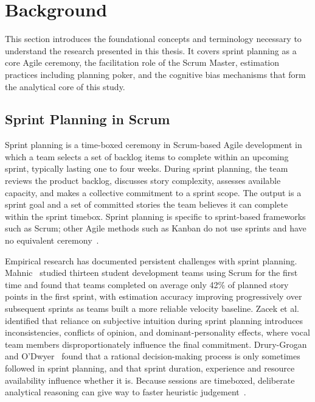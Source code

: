 \documentclass[a4paper,twoside]{bth}
\begin{document}
\section{Background}

This section introduces the foundational concepts and terminology necessary to understand the research presented in this thesis. It covers sprint planning as a core Agile ceremony, the facilitation role of the Scrum Master, estimation practices including planning poker, and the cognitive bias mechanisms that form the analytical core of this study.

\subsection{Sprint Planning in Scrum}

Sprint planning is a time-boxed ceremony in Scrum-based Agile development in which a team selects a set of backlog items to complete within an upcoming sprint, typically lasting one to four weeks. During sprint planning, the team reviews the product backlog, discusses story complexity, assesses available capacity, and makes a collective commitment to a sprint scope. The output is a sprint goal and a set of committed stories the team believes it can complete within the sprint timebox. Sprint planning is specific to sprint-based frameworks such as Scrum; other Agile methods such as Kanban do not use sprints and have no equivalent ceremony~\cite{dybaa2008empirical}.

Empirical research has documented persistent challenges with sprint planning. Mahnic~\cite{mahnic2011case} studied thirteen student development teams using Scrum for the first time and found that teams completed on average only 42\% of planned story points in the first sprint, with estimation accuracy improving progressively over subsequent sprints as teams built a more reliable velocity baseline. Zacek et al.~\cite{zacek2024improvements} identified that reliance on subjective intuition during sprint planning introduces inconsistencies, conflicts of opinion, and dominant-personality effects, where vocal team members disproportionately influence the final commitment. Drury-Grogan and O'Dwyer~\cite{drury2013investigation} found that a rational decision-making process is only sometimes followed in sprint planning, and that sprint duration, experience and resource availability influence whether it is. Because sessions are timeboxed, deliberate analytical reasoning can give way to faster heuristic judgement~\cite[pp.~20--24]{kahneman2011thinking}.
\end{document}

